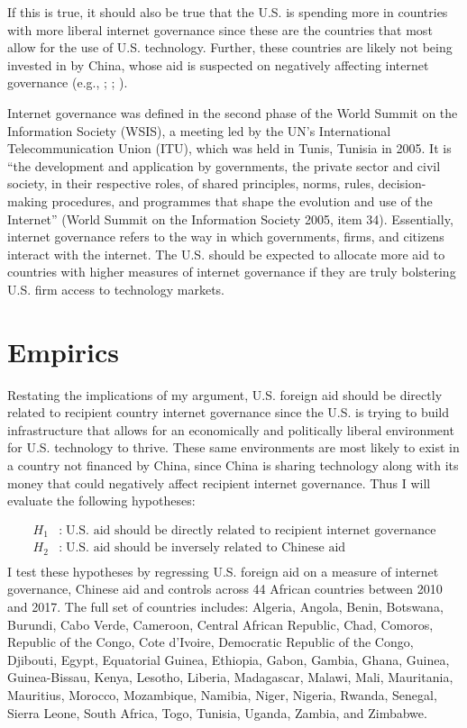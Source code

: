\documentclass[12pt]{article}
\begin{document}
If this is true, it should also be true that the U.S. is spending more in countries with more liberal internet governance since these are the countries that most allow for the use of U.S. technology. Further, these countries are likely not being invested in by China, whose aid is suspected on negatively affecting internet governance (e.g., \cite{triolo2020}; \cite{hillman2021}; \cite{u.s.departmentofstate2022}).

Internet governance was defined in the second phase of the World Summit on the Information Society (WSIS), a meeting led by the UN's International Telecommunication Union (ITU), which was held in Tunis, Tunisia in 2005. It is ``the development and application by governments, the private sector and civil society, in their respective roles, of shared principles, norms, rules, decision-making procedures, and programmes that shape the evolution and use of the Internet'' \nocite{worldsummitontheinformationsociety2005} (World Summit on the Information Society 2005, item 34). Essentially, internet governance refers to the way in which governments, firms, and citizens interact with the internet. The U.S. should be expected to allocate more aid to countries with higher measures of internet governance if they are truly bolstering U.S. firm access to technology markets.

\section*{Empirics}
Restating the implications of my argument, U.S. foreign aid should be directly related to recipient country internet governance since the U.S. is trying to build infrastructure that allows for an economically and politically liberal environment for U.S. technology to thrive. These same environments are most likely to exist in a country not financed by China, since China is sharing technology along with its money that could negatively affect recipient internet governance. Thus I will evaluate the following hypotheses:

\begin{align*}
    H_{1}&:\;\text{U.S. aid should be directly related to recipient internet governance}\\
    H_{2}&:\;\text{U.S. aid should be inversely related to Chinese aid}\\
\end{align*}
I test these hypotheses by regressing U.S. foreign aid on a measure of internet governance, Chinese aid and controls across 44 African countries between 2010 and 2017. The full set of countries includes: Algeria, Angola, Benin, Botswana, Burundi, Cabo Verde, Cameroon, Central African Republic, Chad, Comoros, Republic of the Congo, Cote d'Ivoire, Democratic Republic of the Congo, Djibouti, Egypt, Equatorial Guinea, Ethiopia, Gabon, Gambia, Ghana, Guinea, Guinea-Bissau, Kenya, Lesotho, Liberia, Madagascar, Malawi, Mali, Mauritania, Mauritius, Morocco, Mozambique, Namibia, Niger, Nigeria, Rwanda, Senegal, Sierra Leone, South Africa, Togo, Tunisia, Uganda, Zambia, and Zimbabwe. 
\end{document}
